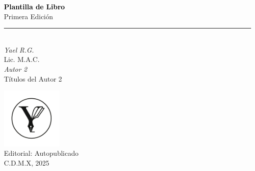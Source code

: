 
\clearpage

\begin{titlepage}
    \thispagestyle{empty} %
    \vfill

    
    \begin{center}
        
        \vspace*{2cm}
        \textcolor{black}{\Huge \textbf{Plantilla de Libro}} \\[0.7cm] %
        {\large Primera Edición} \\[0.3cm]  %

        \rule{\textwidth}{0.4pt} \\[1cm]

        {\Huge \textit{Yael R.G.}} \\[0.5cm]  %
        {\normalsize Lic. M.A.C.} \\[1.5cm]  %

        {\Huge \textit{Autor 2}} \\[0.5cm]  %
        {\normalsize Títulos del Autor 2} \\[8cm]  %
        \maketitle

        \includegraphics[width=3cm]{images/y.png} \\[1cm]  %

        {\Large Editorial: Autopublicado} \\[1cm]  %
        {\large C.D.M.X, 2025}  %
            
    \end{center}
    \vfill
\end{titlepage}
\clearpage